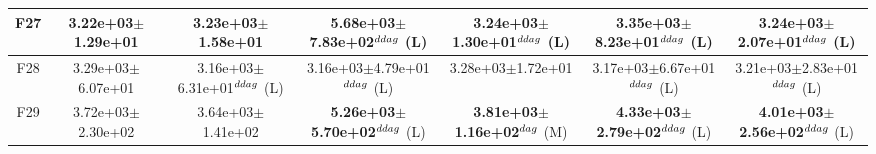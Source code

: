 \begin{table}[!t]
\begin{tabular}{c|cccccc}
F27  & 3.22e+03$\pm$1.29e+01  & 3.23e+03$\pm$1.58e+01   & \textbf{5.68e+03$\pm$7.83e+02}$^{\\ddag}$ (L)  & \textbf{3.24e+03$\pm$1.30e+01}$^{\\ddag}$ (L)  & \textbf{3.35e+03$\pm$8.23e+01}$^{\\ddag}$ (L)  & \textbf{3.24e+03$\pm$2.07e+01}$^{\\ddag}$ (L) \\ \hline
F28  & 3.29e+03$\pm$6.07e+01  & 3.16e+03$\pm$6.31e+01$^{\\ddag}$ (L)  & 3.16e+03$\pm$4.79e+01$^{\\ddag}$ (L)  & 3.28e+03$\pm$1.72e+01   & 3.17e+03$\pm$6.67e+01$^{\\ddag}$ (L)  & 3.21e+03$\pm$2.83e+01$^{\\ddag}$ (L) \\ \hline
F29  & 3.72e+03$\pm$2.30e+02  & 3.64e+03$\pm$1.41e+02   & \textbf{5.26e+03$\pm$5.70e+02}$^{\\ddag}$ (L)  & \textbf{3.81e+03$\pm$1.16e+02}$^{\\dag}$ (M)  & \textbf{4.33e+03$\pm$2.79e+02}$^{\\ddag}$ (L)  & \textbf{4.01e+03$\pm$2.56e+02}$^{\\ddag}$ (L) \\ \hline
\end{tabular}
\end{table}
